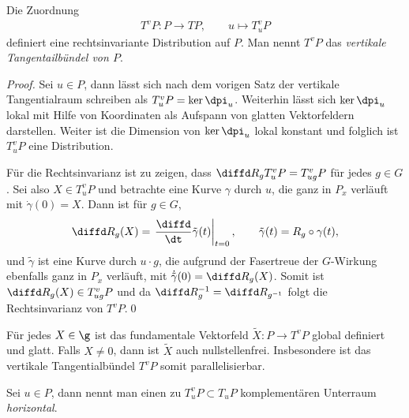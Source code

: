 \documentclass[%
	paper=a5,%
	fleqn,%
	DIV=18,%
	BCOR=0mm,
	fontsize=11pt,
	titlepage=false,%
	bibliography=totoc,
	DIV=18,%
	twoside=true,
	pdftitle=Riemannsche Geometrie,
	pdfauthor=Uwe Semmelmann,
	numbers=noendperiod]%
	{scrbook}
\begin{document}
\begin{cor}
Die Zuordnung
\begin{align*}
T^v P : P\to TP,\qquad  u \mapsto T^v_uP
\end{align*}
definiert eine rechtsinvariante Distribution auf $P$. Man nennt $T^vP$ das
\emph{vertikale Tangentailbündel von $P$}.\fish
\end{cor}
\begin{proof}
Sei $u\in P$, dann lässt sich nach dem vorigen Satz
der vertikale Tangentialraum schreiben als $T^v_uP = \ker\dpi_u$.
Weiterhin lässt sich $\ker\dpi_u$ lokal mit Hilfe von Koordinaten als
Aufspann von glatten Vektorfeldern darstellen. Weiter ist die Dimension von $\ker\dpi_u$
lokal konstant  und folglich ist $T^v_uP$ eine
Distribution.

Für die Rechtsinvarianz ist zu zeigen, dass $\diffd R_g T^v_u P = T^v_{ug}P$
für jedes $g\in G$. Sei also $X\in T^v_uP$ und betrachte eine
Kurve $\gamma$ durch $u$, die ganz in $P_x$ verläuft mit $\dot{\gamma}(0) = X$. 
Dann ist für $g\in G$,
\begin{align*}
\diffd R_g(X) = \left.\frac{\diffd}{\dt} \tilde{\gamma}(t)\right|_{t=0},\qquad
\tilde{\gamma}(t) = R_g\circ\gamma(t),
\end{align*}
und $\tilde{\gamma}$ ist eine Kurve durch $u\cdot g$, die aufgrund der
Fasertreue der $G$-Wirkung ebenfalls ganz in $P_x$ verläuft, mit
$\dot{\tilde{\gamma}}(0) = \diffd R_g(X)$. Somit ist $\diffd R_g(X) \in
T^v_{ug}P$ und da $\diffd R_g^{-1} = \diffd R_{g^{-1}}$ folgt die
Rechtsinvarianz von $T^vP$.\qed
\end{proof}

\begin{rem}
Für jedes $X\in\g$ ist das fundamentale Vektorfeld $\tilde{X}: P\to T^vP$ global
definiert und glatt. Falls $X\neq 0$, dann ist $\tilde X$ auch nullstellenfrei. Insbesondere ist das vertikale
Tangentialbündel $T^vP$ somit parallelisierbar.\map
\end{rem}


\begin{defn}
Sei $u\in P$, dann nennt man einen zu $T^v_uP\subset T_uP$ komplementären
Unterraum \emph{horizontal}.\fish
\end{defn}
\end{document}
